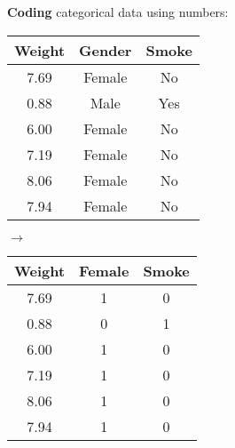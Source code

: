 \documentclass[../mathNotesPreamble]{subfiles}
\begin{document}
  \textbf{Coding} categorical data using numbers:
  \begin{center}
    \begin{tabular}{@{}ccc@{}}\toprule
      Weight & Gender & Smoke\\\midrule
      7.69 & Female & No\\
      0.88 & Male & Yes\\
      6.00 & Female & No\\
      7.19 & Female & No\\
      8.06 & Female & No\\
      7.94 & Female & No\\\bottomrule
    \end{tabular}
    \hspace*{10mm}$\longrightarrow$\hspace*{10mm}
    \begin{tabular}{@{}ccc@{}}\toprule
      Weight & Female & Smoke \\\midrule
      7.69 & 1 & 0\\
      0.88 & 0 & 1\\
      6.00 & 1 & 0\\
      7.19 & 1 & 0\\
      8.06 & 1 & 0\\
      7.94 & 1 & 0\\\bottomrule
    \end{tabular}
  \end{center}
\end{document}
